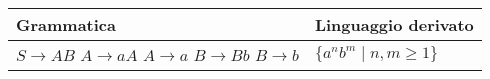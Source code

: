 \documentclass{standalone}
\begin{document}
\begin{tabularx}{\textwidth}{XX}
		Grammatica & Linguaggio derivato\\
    \midrule
        \(S \to AB\) \newline
        \(A \to aA\) \newline
        \(A \to a\) \newline
        \(B \to Bb\) \newline
        \(B \to b\)
        &
        \(\{a^n b^m \mid n,m \ge 1\}\)
\end{tabularx}
\end{document}
